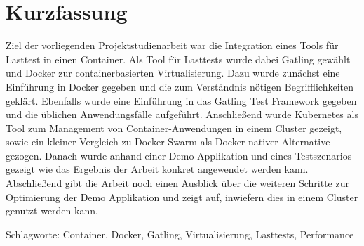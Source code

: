 \chapter*{Kurzfassung}
\thispagestyle{empty}

\bigskip

Ziel der vorliegenden Projektstudienarbeit war die Integration eines Tools für Lasttest in einen Container. Als Tool für Lasttests wurde dabei Gatling gewählt und Docker zur containerbasierten Virtualisierung. Dazu wurde zunächst eine Einführung in Docker gegeben und die zum Verständnis nötigen Begrifflichkeiten geklärt. Ebenfalls wurde eine Einführung in das Gatling Test Framework gegeben und die üblichen Anwendungsfälle aufgeführt. Anschließend wurde Kubernetes als Tool zum Management von Container-Anwendungen in einem Cluster gezeigt, sowie ein kleiner Vergleich zu Docker Swarm als Docker-nativer Alternative gezogen. Danach wurde anhand einer Demo-Applikation und eines Testszenarios gezeigt wie das Ergebnis der Arbeit konkret angewendet werden kann. Abschließend gibt die Arbeit noch einen Ausblick über die weiteren Schritte zur Optimierung der Demo Applikation und zeigt auf, inwiefern dies in einem Cluster genutzt werden kann.

\noindent

\vspace*{\fill}
Schlagworte: 
Container, Docker, Gatling, Virtualisierung, Lasttests, Performance

